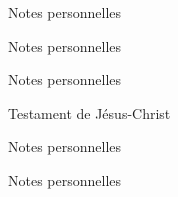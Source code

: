 \documentclass[11pt]{book}
\begin{document}
\clearpage
\clearpage\makeatletter\def\@evenhead{}\def\@oddhead{}\makeatother\begin{center}Notes personnelles\end{center}\clearpage\makeatletter\def\@evenhead{{\NoAutoSpaceBeforeFDP{\small{\rightmark\hfil\thepage\hfil\leftmark}}}}\def\@oddhead{{\NoAutoSpaceBeforeFDP{\small{\rightmark\hfil\thepage\hfil\leftmark}}}}\makeatother
\clearpage
\clearpage\makeatletter\def\@evenhead{}\def\@oddhead{}\makeatother\begin{center}Notes personnelles\end{center}\clearpage\makeatletter\def\@evenhead{{\NoAutoSpaceBeforeFDP{\small{\rightmark\hfil\thepage\hfil\leftmark}}}}\def\@oddhead{{\NoAutoSpaceBeforeFDP{\small{\rightmark\hfil\thepage\hfil\leftmark}}}}\makeatother
\clearpage
\clearpage\makeatletter\def\@evenhead{}\def\@oddhead{}\makeatother\begin{center}Notes personnelles\end{center}\clearpage\makeatletter\def\@evenhead{{\NoAutoSpaceBeforeFDP{\small{\rightmark\hfil\thepage\hfil\leftmark}}}}\def\@oddhead{{\NoAutoSpaceBeforeFDP{\small{\rightmark\hfil\thepage\hfil\leftmark}}}}\makeatother
{}\clearpage
\clearpage\makeatletter\def\@evenhead{}\def\@oddhead{}\makeatother\vspace*{\fill}\begin{center}{\LARGE Testament de Jésus-Christ}\end{center}\vspace*{\fill}\clearpage\makeatletter\def\@evenhead{{\NoAutoSpaceBeforeFDP{\small{\rightmark\hfil\thepage\hfil\leftmark}}}}\def\@oddhead{{\NoAutoSpaceBeforeFDP{\small{\rightmark\hfil\thepage\hfil\leftmark}}}}\makeatother
\clearpage
\clearpage\makeatletter\def\@evenhead{}\def\@oddhead{}\makeatother\begin{center}Notes personnelles\end{center}\clearpage\makeatletter\def\@evenhead{{\NoAutoSpaceBeforeFDP{\small{\rightmark\hfil\thepage\hfil\leftmark}}}}\def\@oddhead{{\NoAutoSpaceBeforeFDP{\small{\rightmark\hfil\thepage\hfil\leftmark}}}}\makeatother
\clearpage
\clearpage\makeatletter\def\@evenhead{}\def\@oddhead{}\makeatother\begin{center}Notes personnelles\end{center}\clearpage\makeatletter\def\@evenhead{{\NoAutoSpaceBeforeFDP{\small{\rightmark\hfil\thepage\hfil\leftmark}}}}\def\@oddhead{{\NoAutoSpaceBeforeFDP{\small{\rightmark\hfil\thepage\hfil\leftmark}}}}\makeatother
\end{document}
